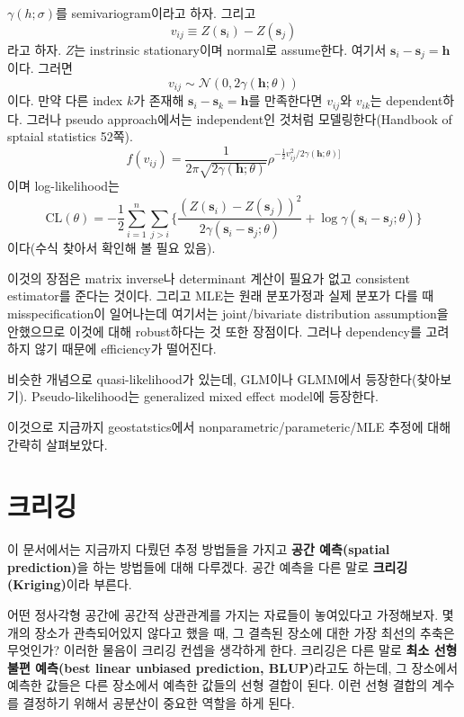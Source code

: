 \documentclass[b5paper,]{scrbook}
\theoremstyle{plain}
\theoremstyle{definition}
\numberwithin{equation}{section}
\begin{document}
\(\gamma(h;\sigma)\)를 semivariogram이라고 하자. 그리고
\[v_{ij}\equiv Z(\mathbf{s}_{i})-Z(\mathbf{s}_{j})\]
라고 하자. \(Z\)는 instrinsic stationary이며 normal로 assume한다. 여기서 \(\mathbf{s}_{i}-\mathbf{s}_{j}=\mathbf{h}\)이다. 그러면
\[v_{ij} \sim \mathcal{N}(0, 2\gamma(\mathbf{h};\theta))\]
이다. 만약 다른 index \(k\)가 존재해 \(\mathbf{s}_{i}-\mathbf{s}_{k}=\mathbf{h}\)를 만족한다면 \(v_{ij}\)와 \(v_{ik}\)는 dependent하다. 그러나 pseudo approach에서는 independent인 것처럼 모델링한다(Handbook of sptaial statistics 52쪽).
\[f(v_{ij})=\frac{1}{2\pi\sqrt{2\gamma(\mathbf{h};\theta)}}\rho^{-\frac{1}{2}v_{ij}^{2}/2\gamma(\mathbf{h};\theta)]}\]
이며 log-likelihood는
\[\text{CL}(\theta)=-\frac{1}{2}\sum_{i=1}^{n}\sum_{j>i}\{ \frac{(Z(\mathbf{s}_{i})-Z(\mathbf{s}_{j}))^{2}}{2\gamma(\mathbf{s}_{i}-\mathbf{s}_{j};\theta)}+\log \gamma(\mathbf{s}_{i}-\mathbf{s}_{j};\theta) \}\]
이다(수식 찾아서 확인해 볼 필요 있음).

이것의 장점은 matrix inverse나 determinant 계산이 필요가 없고 consistent estimator를 준다는 것이다. 그리고 MLE는 원래 분포가정과 실제 분포가 다를 때 misspecification이 일어나는데 여기서는 joint/bivariate distribution assumption을 안했으므로 이것에 대해 robust하다는 것 또한 장점이다. 그러나 dependency를 고려하지 않기 때문에 efficiency가 떨어진다.

비슷한 개념으로 quasi-likelihood가 있는데, GLM이나 GLMM에서 등장한다(찾아보기). Pseudo-likelihood는 generalized mixed effect model에 등장한다.

이것으로 지금까지 geostatstics에서 nonparametric/parameteric/MLE 추정에 대해 간략히 살펴보았다.

\hypertarget{kriging}{%
\chapter{크리깅}\label{kriging}}

이 문서에서는 지금까지 다뤘던 추정 방법들을 가지고 \textbf{공간 예측(spatial prediction)}을 하는 방법들에 대해 다루겠다. 공간 예측을 다른 말로 \textbf{크리깅(Kriging)}이라 부른다.

어떤 정사각형 공간에 공간적 상관관계를 가지는 자료들이 놓여있다고 가정해보자. 몇 개의 장소가 관측되어있지 않다고 했을 때, 그 결측된 장소에 대한 가장 최선의 추축은 무엇인가? 이러한 물음이 크리깅 컨셉을 생각하게 한다. 크리깅은 다른 말로 \textbf{최소 선형 불편 예측(best linear unbiased prediction, BLUP)}라고도 하는데, 그 장소에서 예측한 값들은 다른 장소에서 예측한 값들의 선형 결합이 된다. 이런 선형 결합의 계수를 결정하기 위해서 공분산이 중요한 역할을 하게 된다.
\end{document}
